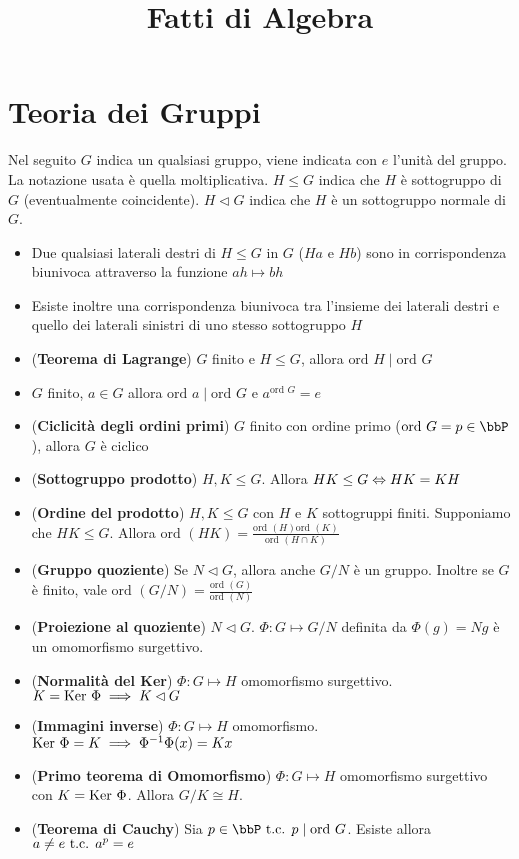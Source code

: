 \documentclass[a4paper,NoNotes,GeneralMath]{stdmdoc}
\newcommand{\Ord}{\text{ord }}
\newcommand{\sgr}{\le}
\newcommand{\nrm}{\lhd}
\begin{document}
	\title{Fatti di Algebra}

	\section*{Teoria dei Gruppi}
	Nel seguito $G$ indica un qualsiasi gruppo, viene indicata con $e$ l'unità del gruppo. La notazione usata è quella moltiplicativa. $H \sgr G$ indica che $H$ è sottogruppo di $G$ (eventualmente coincidente). $H \nrm G$ indica che $H$ è un sottogruppo normale di $G$.
	\begin{itemize}
		\item Due qualsiasi laterali destri di $H \sgr G$ in $G$ ($Ha$ e $Hb$) sono in corrispondenza biunivoca attraverso la funzione $ah \mapsto bh$
		\item Esiste inoltre una corrispondenza biunivoca tra l'insieme dei laterali destri e quello dei laterali sinistri di uno stesso sottogruppo $H$
		\item ({\bf Teorema di Lagrange}) $G$ finito e $H \sgr G$, allora $\Ord H \mid \Ord G$
		\item $G$ finito, $a \in G$ allora $\Ord a \mid \Ord G$ e $a^{\Ord G} = e$
		\item ({\bf Ciclicità degli ordini primi}) $G$ finito con ordine primo ($\Ord G = p \in \bbP$), allora $G$ è ciclico
		\item ({\bf Sottogruppo prodotto}) $H, K \sgr G$. Allora $HK \sgr G \sse HK = KH$
		\item ({\bf Ordine del prodotto}) $H, K \sgr G$ con $H$ e $K$ sottogruppi finiti. Supponiamo che $HK \sgr G$. Allora $\Ord(HK) = \frac{\Ord(H)\Ord(K)}{\Ord(H\cap K)}$
		\item ({\bf Gruppo quoziente}) Se $N \nrm G$, allora anche $G/N$ è un gruppo. Inoltre se $G$ è finito, vale $\Ord(G/N) = \frac{\Ord(G)}{\Ord(N)}$
		\item ({\bf Proiezione al quoziente}) $N \nrm G$. $\Phi: G \mapsto G/N$ definita da $\Phi(g) = Ng$ è un omomorfismo surgettivo.
		\item ({\bf Normalità del Ker}) $\Phi: G \mapsto H$ omomorfismo surgettivo. $K = \Ker \Phi \implies K \nrm G$
		\item ({\bf Immagini inverse}) $\Phi: G \mapsto H$ omomorfismo. $\mbox{Ker } \Phi = K \implies \Phi^{-1}\Phi(x) = Kx$
		\item ({\bf Primo teorema di Omomorfismo}) $\Phi: G \mapsto H$ omomorfismo surgettivo con $K = \mbox{Ker } \Phi$. Allora $G/K \cong H$.
		\item ({\bf Teorema di Cauchy}) Sia $p \in \bbP \tc p \mid \Ord G$. Esiste allora $a \neq e \mbox{ t.c. } a^p = e$

\end{itemize}
\end{document}
